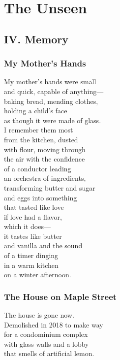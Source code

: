 \documentclass[
    language=english,
    doctype=poetry-collection,
    institution=none,
]{../../omnilatex}
\begin{document}
\part{The Unseen}

\chapter*{IV. Memory}

\begin{center}
\begin{minipage}{0.7\textwidth}
\section*{My Mother's Hands}

My mother's hands were small\\
and quick, capable of anything---\\
baking bread, mending clothes,\\
holding a child's face\\
as though it were made of glass.\\

I remember them most\\
from the kitchen, dusted\\
with flour, moving through\\
the air with the confidence\\
of a conductor leading\\
an orchestra of ingredients,\\
transforming butter and sugar\\
and eggs into something\\
that tasted like love\\
if love had a flavor,\\
which it does---\\
it tastes like butter\\
and vanilla and the sound\\
of a timer dinging\\
in a warm kitchen\\
on a winter afternoon.
\end{minipage}
\end{center}

\section*{The House on Maple Street}

The house is gone now.\\
Demolished in 2018 to make way\\
for a condominium complex\\
with glass walls and a lobby\\
that smells of artificial lemon.\\
\end{document}
